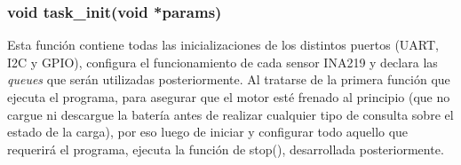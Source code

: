                 \subsubsection{void task\_init(void *params)}
                    Esta función contiene todas las inicializaciones de los distintos puertos (UART, I2C y GPIO), configura el funcionamiento de cada sensor INA219 y declara las \textit{queues} que serán utilizadas posteriormente. Al tratarse de la primera función que ejecuta el programa, para asegurar que el motor esté frenado al principio (que no cargue ni descargue la batería antes de realizar cualquier tipo de consulta sobre el estado de la carga), por eso luego de iniciar y configurar todo aquello que requerirá el programa, ejecuta la función de stop(), desarrollada posteriormente.\par

